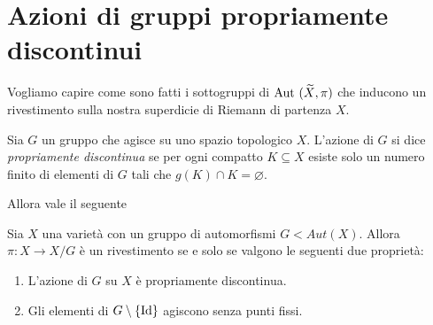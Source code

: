 \section{Azioni di gruppi propriamente discontinui}

Vogliamo capire come sono fatti i sottogruppi di $\text{Aut }(\widetilde X,\pi)$ che inducono un rivestimento sulla nostra superdicie di Riemann di partenza $X$.

\begin{definizione}
Sia $G$ un gruppo che agisce su uno spazio topologico $X$. L'azione di $G$ si dice \textit{propriamente discontinua} se per ogni compatto $K\subseteq X$ esiste solo un numero finito di elementi di $G$ tali che $g(K)\cap K =\varnothing$.
\end{definizione}

Allora vale il seguente
\begin{teorema}
Sia $X$ una varietà con un gruppo di automorfismi $G<Aut(X)$. Allora $\pi:X\to X/G$ è un rivestimento se e solo se valgono le seguenti due proprietà:
\begin{enumerate}
  \item L'azione di $G$ su $X$ è propriamente discontinua.
  \item Gli elementi di $G\setminus\{\text{Id}\}$ agiscono senza punti fissi.
\end{enumerate}
\end{teorema}
